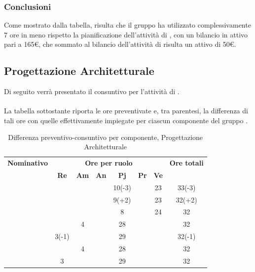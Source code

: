 \subsubsection{Conclusioni}
Come mostrato dalla tabella, risulta che il gruppo ha utilizzato complessivamente 7 ore in meno rispetto la pianificazione dell'attività di \textit{\AD}, con un bilancio in attivo pari a 165€, che sommato al bilancio dell'attività di \textit{\AR} risulta un attivo di 50€.

\newpage
\subsection{Progettazione Architetturale}

Di seguito verrà presentato il consuntivo per l'attività di \textit{\PA}.
\\\\
La tabella sottostante riporta le ore preventivate e, tra parentesi, la differenza di tali ore con quelle effettivamente impiegate per ciascun componente del gruppo \gruppo.

\begin{table}[H]
	\begin{center}
		\begin{tabular}{|c|c|c|c|c|c|c|c|}
			\hline
			\textbf{Nominativo} & \multicolumn{6}{c|}{\textbf{Ore per ruolo}} & \textbf{Ore totali} \\
			& \textbf{Re} & \textbf{Am} & \textbf{An} & \textbf{Pj} & \textbf{Pr} & \textbf{Ve} & \\
			\hline
			\FB			&		&		&		&	10(-3)	&		&	23	&	33(-3)	\\
			\hline
			\AF			&		&		&		&	9(+2) 	&		&	23	& 	32(+2)	\\
			\hline
			\GN			&		&		&		&	8	&		&	24	&	32	\\
			\hline
			\GR			&		&	4	&  		&	28	&	 	& 		&	32	\\
			\hline
			\SM 		&	3(-1)	&		&		&	29	&		& 		&	32(-1)	\\
			\hline
			\MP 		& 		&	4	&		&	28	&		&		&	32	\\
			\hline
			\MV 		&	3	&		&		&	29	&		&		& 	32	\\
			\hline
		\end{tabular}
	\end{center}
	\caption{Differenza preventivo-consuntivo per componente, Progettazione Architetturale}
\end{table}

